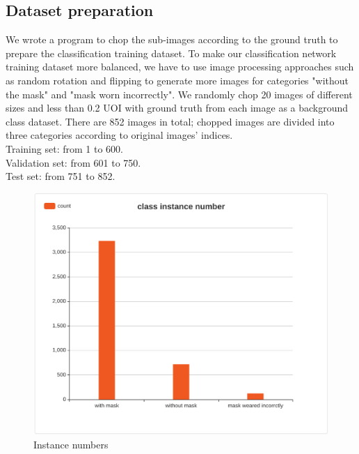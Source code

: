 \documentclass[10pt,a4paper]{report}
\begin{document}
\subsection{Dataset preparation}
We wrote a program to chop the sub-images according to the ground truth to prepare the classification training dataset. To make our classification network training dataset more balanced, we have to use image processing approaches such as random rotation and flipping to generate more images for categories "without the mask" and "mask worn incorrectly". We randomly chop 20 images of different sizes and less than 0.2 UOI with ground truth from each image as a background class dataset. There are 852 images in total; chopped images are divided into three categories according to original images' indices. \\
Training set: from 1 to 600. \\
Validation set: from 601 to 750. \\
Test set: from 751 to 852.  
\begin{figure}[hbtp]

\centering
\includegraphics[scale=0.2]{imgs/instance numbers.png}
\caption{Instance numbers}
        \label{fig:Instance numbers}
\end{figure}
\end{document}
